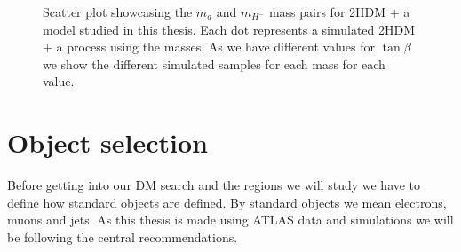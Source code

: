 \documentclass[12pt, a4paper]{book}
\begin{document}
\begin{figure}[!ht]
\begin{subfigure}[b]{0.45\textwidth}
    \end{subfigure}
    \caption[$m_a$ and $m_{H^-}$ mass pairs for 2HDM + a model]{Scatter plot showcasing the $m_a$ and $m_{H^-}$ mass pairs for 2HDM + a model studied in this thesis. Each dot represents a simulated 2HDM + a process using the masses. As we have different values for $\tan\beta$ we show the different simulated samples for each mass for each value.}\label{fig:2HDM_mass}
\end{figure}

\section{Object selection}\label{sec:obj_sel}
Before getting into our DM search and the regions we will study we have to define how standard objects are defined. By standard objects we mean electrons, muons and jets. As this thesis is made using ATLAS data and simulations we will be following the central recommendations.%
\end{document}
